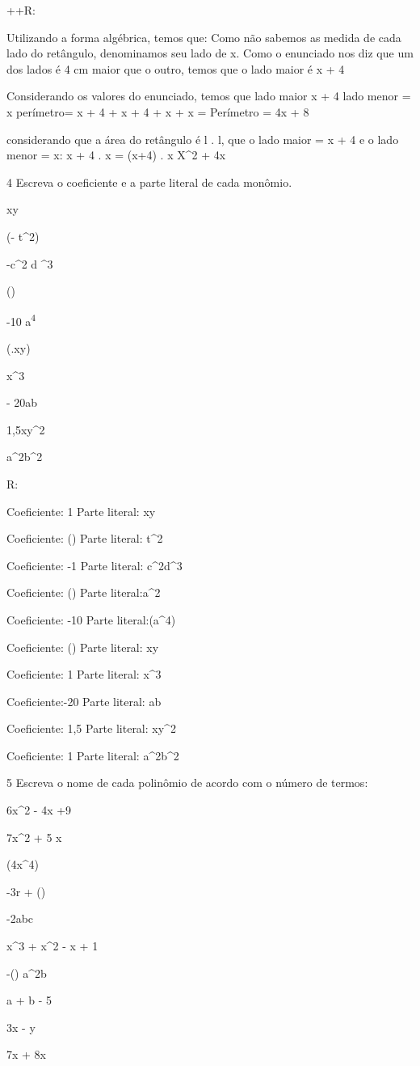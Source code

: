 {++R:
\item Utilizando a forma algébrica, temos que:
Como não sabemos as medida de cada lado do retângulo, denominamos seu
lado de x. Como o enunciado nos diz que um dos lados é 4 cm maior que o
outro, temos que o lado maior é
x + 4
\item Considerando os valores do enunciado, temos que
lado maior x + 4
lado menor = x
perímetro= x + 4 + x + 4 + x + x =
Perímetro = 4x + 8
\item considerando que a área do retângulo é l . l, que o lado maior = x +
4 e o lado menor = x:
x + 4 . x =
(x+4) . x
X^2 + 4x

\num{4} Escreva o coeficiente e a parte literal de cada monômio.
\item xy
\item (- t^2)
\item -c^2 d ^3
\item ()
\item-10 a\textsuperscript{4}
\item (.{xy})
\item x^3
\item - 20ab
\item 1,5xy^2
\item a^2b^2

R:
\item
Coeficiente: 1
Parte literal: xy
\item Coeficiente: ()
Parte literal: t^2
\item Coeficiente: -1
Parte literal: c^2d^3
\item Coeficiente: ()
Parte literal:a^2
\item Coeficiente: -10
Parte literal:(a^4)
\item Coeficiente: ()
Parte literal: xy
\item Coeficiente: 1
Parte literal: x^3
\item Coeficiente:-20
Parte literal: ab
\item Coeficiente: 1,5
Parte literal: xy^2
\item Coeficiente: 1
Parte literal: a^2b^2

\num{5} Escreva o nome de cada polinômio de acordo com o número de termos:
\item 6x^2 - 4x +9
\item 7x^2 + 5 x
\item (4x^4)
\item -3r + ()
\item -2abc
\item x^3 + x^2 - x + 1
\item -() a^2b
\item a + b - 5
\item 3x - y
\item 7x + 8x

}
